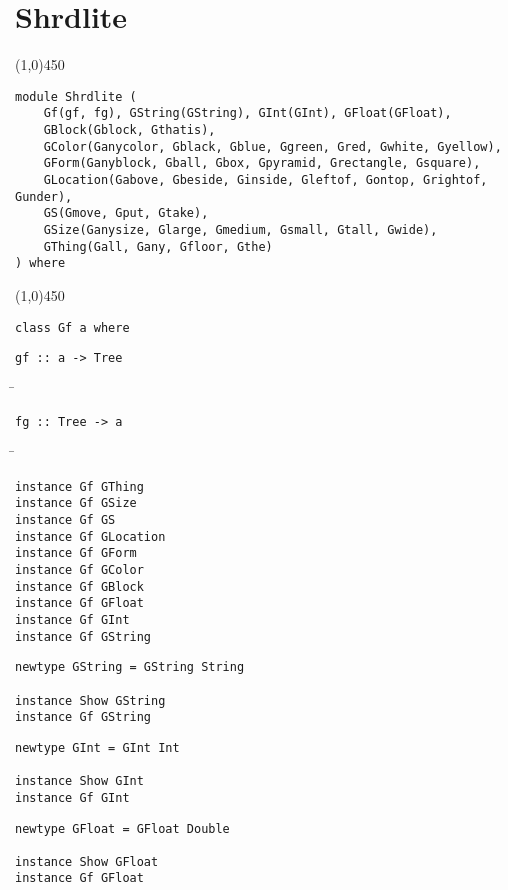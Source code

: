\section{Shrdlite}
\begin{center}
\line(1,0){450}
\end{center}
\begin{verbatim}
module Shrdlite (
    Gf(gf, fg), GString(GString), GInt(GInt), GFloat(GFloat),
    GBlock(Gblock, Gthatis),
    GColor(Ganycolor, Gblack, Gblue, Ggreen, Gred, Gwhite, Gyellow),
    GForm(Ganyblock, Gball, Gbox, Gpyramid, Grectangle, Gsquare),
    GLocation(Gabove, Gbeside, Ginside, Gleftof, Gontop, Grightof, Gunder),
    GS(Gmove, Gput, Gtake),
    GSize(Ganysize, Glarge, Gmedium, Gsmall, Gtall, Gwide),
    GThing(Gall, Gany, Gfloor, Gthe)
) where
\end{verbatim}
\begin{center}
\line(1,0){450}
\end{center}
\begin{verbatim}
class Gf a where
\end{verbatim}
\begin{verbatim}
gf :: a -> Tree
\end{verbatim}
\begin{tabbing}
\hspace*{1cm}\= \kill
\> 
\end{tabbing}
\begin{verbatim}
fg :: Tree -> a
\end{verbatim}
\begin{tabbing}
\hspace*{1cm}\= \kill
\> 
\end{tabbing}
\begin{verbatim}
instance Gf GThing
instance Gf GSize
instance Gf GS
instance Gf GLocation
instance Gf GForm
instance Gf GColor
instance Gf GBlock
instance Gf GFloat
instance Gf GInt
instance Gf GString
\end{verbatim}
\begin{verbatim}
newtype GString = GString String

instance Show GString
instance Gf GString
\end{verbatim}
\begin{verbatim}
newtype GInt = GInt Int

instance Show GInt
instance Gf GInt
\end{verbatim}
\begin{verbatim}
newtype GFloat = GFloat Double

instance Show GFloat
instance Gf GFloat
\end{verbatim}
